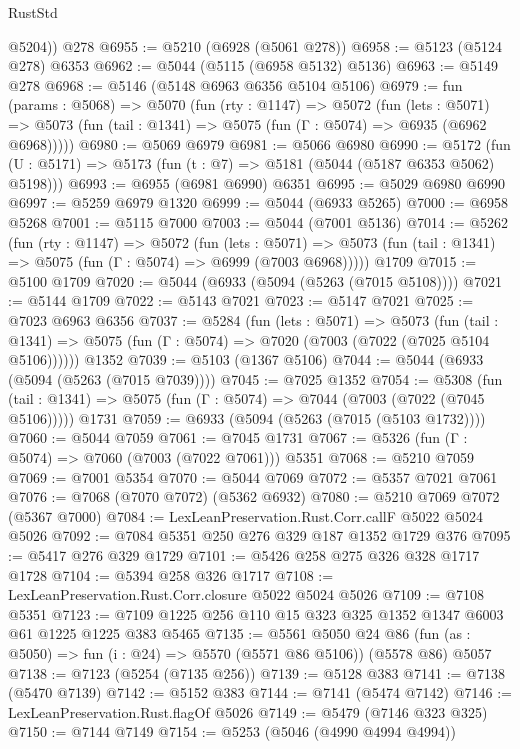 \begin{lexlean}{RustStd}
\begin{coremodule}
        @5204))
    @278
@6955 := @5210 (@6928 (@5061 @278))
@6958 := @5123 (@5124 @278) @6353
@6962 := @5044 (@5115 (@6958 @5132) @5136)
@6963 := @5149 @278
@6968 := @5146 (@5148 @6963 @6356 @5104 @5106)
@6979 := fun (params : @5068) =>
  @5070
    (fun (rty : @1147) =>
    @5072
      (fun (lets : @5071) =>
      @5073 (fun (tail : @1341) => @5075 (fun (Γ : @5074) => @6935 (@6962 @6968)))))
@6980 := @5069 @6979
@6981 := @5066 @6980
@6990 := @5172 (fun (U : @5171) => @5173 (fun (t : @7) => @5181 (@5044 (@5187 @6353 @5062) @5198)))
@6993 := @6955 (@6981 @6990) @6351
@6995 := @5029 @6980 @6990
@6997 := @5259 @6979 @1320
@6999 := @5044 (@6933 @5265)
@7000 := @6958 @5268
@7001 := @5115 @7000
@7003 := @5044 (@7001 @5136)
@7014 := @5262
    (fun (rty : @1147) =>
    @5072
      (fun (lets : @5071) =>
      @5073 (fun (tail : @1341) => @5075 (fun (Γ : @5074) => @6999 (@7003 @6968)))))
    @1709
@7015 := @5100 @1709
@7020 := @5044 (@6933 (@5094 (@5263 (@7015 @5108))))
@7021 := @5144 @1709
@7022 := @5143 @7021
@7023 := @5147 @7021
@7025 := @7023 @6963 @6356
@7037 := @5284
    (fun (lets : @5071) =>
    @5073
      (fun (tail : @1341) => @5075 (fun (Γ : @5074) => @7020 (@7003 (@7022 (@7025 @5104 @5106))))))
    @1352
@7039 := @5103 (@1367 @5106)
@7044 := @5044 (@6933 (@5094 (@5263 (@7015 @7039))))
@7045 := @7025 @1352
@7054 := @5308
    (fun (tail : @1341) => @5075 (fun (Γ : @5074) => @7044 (@7003 (@7022 (@7045 @5106)))))
    @1731
@7059 := @6933 (@5094 (@5263 (@7015 (@5103 @1732))))
@7060 := @5044 @7059
@7061 := @7045 @1731
@7067 := @5326 (fun (Γ : @5074) => @7060 (@7003 (@7022 @7061))) @5351
@7068 := @5210 @7059
@7069 := @7001 @5354
@7070 := @5044 @7069
@7072 := @5357 @7021 @7061
@7076 := @7068 (@7070 @7072) (@5362 @6932)
@7080 := @5210 @7069 @7072 (@5367 @7000)
@7084 := LexLeanPreservation.Rust.Corr.callF @5022 @5024 @5026
@7092 := @7084 @5351 @250 @276 @329 @187 @1352 @1729 @376
@7095 := @5417 @276 @329 @1729
@7101 := @5426 @258 @275 @326 @328 @1717 @1728
@7104 := @5394 @258 @326 @1717
@7108 := LexLeanPreservation.Rust.Corr.closure @5022 @5024 @5026
@7109 := @7108 @5351
@7123 := @7109 @1225 @256 @110 @15 @323 @325 @1352 @1347 @6003 @61 @1225 @1225 @383 @5465
@7135 := @5561
    @5050
    @24
    @86
    (fun (as : @5050) => fun (i : @24) => @5570 (@5571 @86 @5106))
    (@5578 @86)
    @5057
@7138 := @7123 (@5254 (@7135 @256))
@7139 := @5128 @383
@7141 := @7138 (@5470 @7139)
@7142 := @5152 @383
@7144 := @7141 (@5474 @7142)
@7146 := LexLeanPreservation.Rust.flagOf @5026
@7149 := @5479 (@7146 @323 @325)
@7150 := @7144 @7149
@7154 := @5253 (@5046 (@4990 @4994 @4994))

\end{coremodule}
\end{lexlean}
